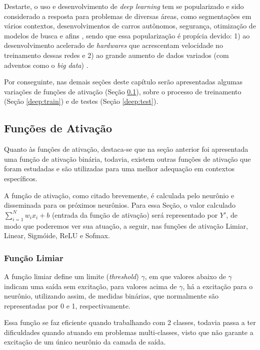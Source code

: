Destarte, o uso e desenvolvimento de \textit{deep learning} tem se popularizado e sido considerado a resposta para problemas de diversas áreas, como segmentações em vários contextos, desenvolvimentos de carros autônomos, segurança, otimização de modelos de busca e afins \citep{Ghosh2019}, sendo que essa popularização é propícia devido: 1) ao desenvolvimento acelerado de \textit{hardwares} que acrescentam velocidade no treinamento dessas redes e 2) ao grande aumento de dados variados (com adventos como o \textit{big data}) \citep{Szegedy2015, ponti2018funciona}.

Por conseguinte, nas demais seções deste capítulo serão apresentadas algumas variações de funções de ativação (Seção \ref{deep:activation}), sobre o processo de treinamento (Seção \ref{deep:train}) e de testes (Seção \ref{deep:test}).


\subsection{Funções de Ativação}
\label{deep:activation}

Quanto às funções de ativação, destaca-se que na seção anterior foi apresentada uma função de ativação binária, todavia, existem outras funções de ativação que foram estudadas e são utilizadas para uma melhor adequação em contextos específicos.

A função de ativação, como citado brevemente, é calculada pelo neurônio e disseminada para os próximos neurônios.  Para essa Seção, o valor calculado $\sum_{i = 1}^{N} w_ix_i +b$ (entrada da função de ativação) será representado por $Y'$, de modo que poderemos ver sua atuação, a seguir, nas funções de ativação Limiar, Linear, Sigmóide, ReLU e Sofmax.


\subsubsection{Função Limiar}
\label{deep:limiar}
A função limiar define um limite (\textit{threshold}) $\gamma$, em que valores abaixo de $\gamma$ indicam uma saída sem excitação, para valores acima de $\gamma$, há a excitação para o neurônio, utilizando assim, de medidas binárias, que normalmente são representadas por 0 e 1, respectivamente.

Essa função se faz eficiente quando trabalhando com 2 classes, todavia passa a ter dificuldades quando atuando em problemas multi-classes, visto que não garante a excitação de um único neurônio da camada de saída.


